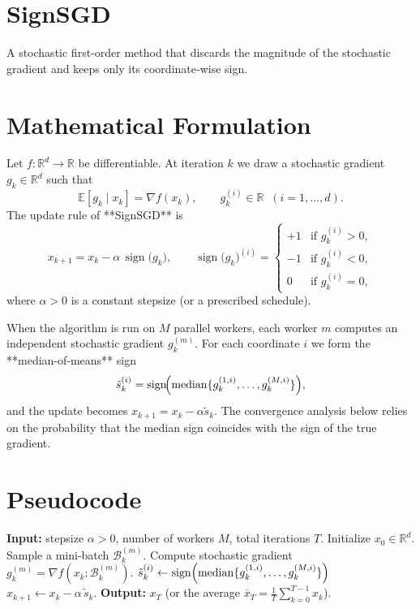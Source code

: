 \documentclass{article}
\newcommand{\sign}{\operatorname{sign}}
\newcommand{\E}{\mathbb{E}}
\newcommand{\R}{\mathbb{R}}
\begin{document}
\section*{SignSGD}
A stochastic first‑order method that discards the magnitude of the stochastic gradient and keeps only its coordinate‑wise sign.

\section*{Mathematical Formulation}
Let $f:\R^{d}\rightarrow\R$ be differentiable.  
At iteration $k$ we draw a stochastic gradient $g_k\in\R^{d}$ such that  
\[
\E\!\left[g_k\mid x_k\right]=\nabla f(x_k),\qquad 
g_k^{(i)}\in\R\;\;(i=1,\dots ,d).
\]
The update rule of **SignSGD** is
\begin{equation}
\boxed{
x_{k+1}=x_k-\alpha\,\sign\!\bigl(g_k\bigr)},
\qquad 
\sign\!\bigl(g_k\bigr)^{(i)}=
\begin{cases}
+1 &\text{if }g_k^{(i)}>0,\\[2pt]
-1 &\text{if }g_k^{(i)}<0,\\[2pt]
0  &\text{if }g_k^{(i)}=0,
\end{cases}
\tag{1}
\end{equation}
where $\alpha>0$ is a constant stepsize (or a prescribed schedule).

When the algorithm is run on $M$ parallel workers, each worker $m$ computes an independent stochastic gradient $g_k^{(m)}$.  
For each coordinate $i$ we form the **median‑of‑means** sign
\[
\tilde{s}_k^{(i)}=\sign\!\Bigl(\operatorname{median}\{g_k^{(1,i)},\dots,g_k^{(M,i)}\}\Bigr),
\]
and the update becomes $x_{k+1}=x_k-\alpha\tilde{s}_k$.
The convergence analysis below relies on the probability that the median sign coincides with the sign of the true gradient.

\section*{Pseudocode}
\begin{algorithm}[H]
\caption{SignSGD with median‑of‑means}
\begin{algorithmic}[1]
\STATE \textbf{Input:} stepsize $\alpha>0$, number of workers $M$, total iterations $T$.
\STATE Initialize $x_0\in\R^{d}$.
        \STATE Sample a mini‑batch $\mathcal{B}_k^{(m)}$.
        \STATE Compute stochastic gradient $g_k^{(m)}=\nabla f(x_k;\mathcal{B}_k^{(m)})$.
    \ENDFOR
        \STATE $\displaystyle \tilde{s}_k^{(i)}\gets \sign\Bigl(\operatorname{median}\{g_k^{(1,i)},\dots,g_k^{(M,i)}\}\Bigr)$
    \ENDFOR
    \STATE $x_{k+1}\gets x_k-\alpha\,\tilde{s}_k$.
\ENDFOR
\STATE \textbf{Output:} $x_T$ (or the average $\bar{x}_T=\frac1T\sum_{k=0}^{T-1}x_k$).
\end{algorithmic}
\end{algorithm}
\end{document}
